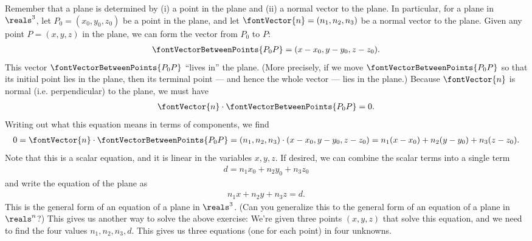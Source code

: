 {Remember that a plane is determined by (i) a point in the plane and (ii) a normal vector to the plane. In particular, for a plane in $\reals^{3}$, let $P_{0} = (x_{0},y_{0},z_{0})$ be a point in the plane, and let $\fontVector{n} = (n_{1},n_{2},n_{3})$ be a normal vector to the plane. Given any point $P = (x,y,z)$ in the plane, we can form the vector from $P_{0}$ to $P$:
\begin{align*}
\fontVectorBetweenPoints{P_{0} P}
=
(x - x_{0},y - y_{0},z - z_{0}).
\end{align*}
This vector $\fontVectorBetweenPoints{P_{0} P}$ ``lives in'' the plane. (More precisely, if we move $\fontVectorBetweenPoints{P_{0} P}$ so that its initial point lies in the plane, then its terminal point --- and hence the whole vector --- lies in the plane.) Because $\fontVector{n}$ is normal (i.e. perpendicular) to the plane, we must have
\begin{align*}
\fontVector{n} \cdot \fontVectorBetweenPoints{P_{0} P}
=
0.
\end{align*}
Writing out what this equation means in terms of components, we find
\begin{align*}
0
=
\fontVector{n} \cdot \fontVectorBetweenPoints{P_{0} P}
=
(n_{1},n_{2},n_{3}) \cdot (x - x_{0},y - y_{0},z - z_{0})
=
n_{1} (x - x_{0}) + n_{2} (y - y_{0}) + n_{3} (z - z_{0}).
\end{align*}
Note that this is a scalar equation, and it is linear in the variables $x,y,z$. If desired, we can combine the scalar terms into a single term
\begin{align*}
d
=
n_{1} x_{0} + n_{2} y_{0} + n_{3} z_{0}
\end{align*}
and write the equation of the plane as
\begin{align*}
n_{1} x + n_{2} y + n_{3} z
=
d.
\end{align*}
This is the general form of an equation of a plane in $\reals^{3}$. (Can you generalize this to the general form of an equation of a plane in $\reals^{n}$?) This gives us another way to solve the above exercise: We're given three points $(x,y,z)$ that solve this equation, and we need to find the four values $n_{1},n_{2},n_{3},d$. This gives us three equations (one for each point) in four unknowns. 
}%